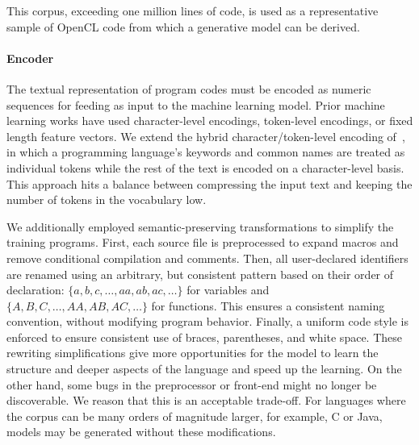 This corpus, exceeding one million lines of code, is used as a representative sample of OpenCL code from which a generative model can be derived.

\paragraph{Encoder} The textual representation of program codes must be encoded as numeric sequences for feeding as input to the machine learning model. Prior machine learning works have used character-level encodings, token-level encodings, or fixed length feature vectors. We extend the hybrid character/token-level encoding of~\cite{Cummins2017b}, in which a programming language's keywords and common names are treated as individual tokens while the rest of the text is encoded on a character-level basis. This approach hits a balance between compressing the input text and keeping the number of tokens in the vocabulary low.

We additionally employed semantic-preserving transformations to simplify the training programs. First, each source file is preprocessed to expand macros and remove conditional compilation and comments. Then, all user-declared identifiers are renamed using an arbitrary, but consistent pattern based on their order of declaration: $\{a,\allowbreak b,\allowbreak c,\allowbreak \ldots,\allowbreak aa,\allowbreak ab,\allowbreak ac,\allowbreak \ldots\}$ for variables and $\{A,\allowbreak B,\allowbreak C,\allowbreak \ldots,\allowbreak AA,\allowbreak AB,\allowbreak AC,\allowbreak \ldots\}$ for functions. This ensures a consistent naming convention, without modifying program behavior. Finally, a uniform code style is enforced to ensure consistent use of braces, parentheses, and white space. These rewriting simplifications give more opportunities for the model to learn the structure and deeper aspects of the language and speed up the learning. On the other hand, some bugs in the preprocessor or front-end might no longer be discoverable. We reason that this is an acceptable trade-off. For languages where the corpus can be many orders of magnitude larger, for example, C or Java, models may be generated without these modifications.

